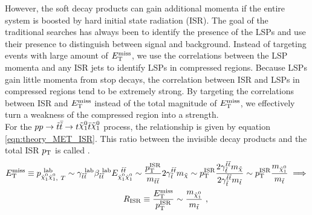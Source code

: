 
\indent However, the soft decay products can gain additional momenta if the entire system is boosted by hard initial state radiation (ISR).  The goal of the traditional searches has always been to identify the presence of the LSPs and use their presence to distinguish between signal and background.  Instead of targeting events with large amount of $E_{\mathrm{T}}^{\mathrm{miss}}$, we use the correlations between the LSP momenta and any ISR jets to identify LSPs in compressed regions.\cite{Pheno1,Pheno2}  Because LSPs gain little momenta from stop decays, the correlation between ISR and LSPs in compressed regions tend to be extremely strong.  By targeting the correlations between ISR and $E_{\mathrm{T}}^{\mathrm{miss}}$ instead of the total magnitude of $E_{\mathrm{T}}^{\mathrm{miss}}$, we effectively turn a weakness of the compressed region into a strength. \\

\indent For the $p p \rightarrow \antibar{\stop} \rightarrow t\ninoone\tbar\ninoone$ process, the relationship is given by equation \ref{eqn:theory_MET_ISR}. This ratio between the invisible decay products and the total ISR $p_{\mathrm{T}}$ is called \RISR. \\

\begin{align}
\MET \equiv p_{\ninoone\ninoone,~T}^{~\mathrm{lab}} \sim \gamma_{\stop\stop}^{~\mathrm{lab}} \beta_{\stop\stop}^{~\mathrm{lab}} E_{\ninoone\ninoone}^{~\stop\stop} 
\sim \frac{\PTISR}{m_{\stop\stop}} 2\gamma_{\stop}^{\stop\stop} m_{\tilde{\chi}} \sim
\PTISR \frac{ 2\gamma_{\stop}^{\stop\stop} m_{\tilde{\chi}} }{ 2\gamma_{\stop}^{\stop\stop} m_{\stop} } \sim
\PTISR \frac{m_{\ninoone}}{m_{\stop}}\implies\\
\RISR \equiv \frac{\MET}{\PTISR} \sim \frac{m_{\ninoone}}{m_{\stop}}~,\quad\quad\quad\quad\quad\quad\quad\quad\quad\quad\quad\quad
\label{eqn:theory_MET_ISR}
\end{align}


